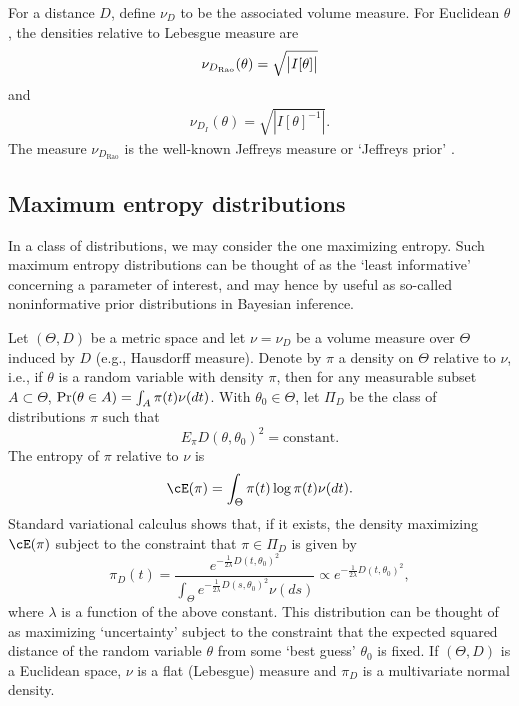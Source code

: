 \documentclass[preprint,12pt,authoryear]{elsarticle}
\def\lambdaexp{\frac{1}{2\lambda}} %
\DeclarePairedDelimiter{\abs}{\lvert}{\rvert}
\def\Pr{\mathop{\rm Pr}\nolimits}
\begin{document}


For a distance $D$, define $\nu_D$ to be the associated volume measure. For Euclidean $\theta$, the densities relative to Lebesgue measure are
\begin{align}\label{jef}
\nu_{D_\text{Rao}}(\theta)=\sqrt{\abs[\big]{I[\theta]}}
\end{align}
and
\begin{align}\label{invjef}
   \nu_{D_I}(\theta)=\sqrt{|I[\theta]^{-1}|}.
\end{align}
The measure $\nu_{D_\text{Rao}}$ is the well-known Jeffreys measure or `Jeffreys prior' \citep{jeffreys46}.




\subsection{Maximum entropy distributions}\label{app-maxent}

In a class of distributions, we may consider the one maximizing entropy. Such maximum entropy distributions can be thought of as the `least informative' concerning a parameter of interest, and may hence by useful as so-called noninformative prior distributions in Bayesian inference.

Let $(\Theta,D)$ be a metric space and let $\nu=\nu_D$ be a volume measure over $\Theta$ induced by $D$ (e.g., Hausdorff measure).
Denote by $\pi$ a density on $\Theta$ relative to $\nu$, i.e., if $\theta$ is a random variable with density $\pi$, then for any measurable subset $A\subset\Theta$, $\Pr(\theta\in A)=\int_A\pi(t)\nu(dt)$.
With $\theta_0\in\Theta$, let $\Pi_D$ be the class of distributions $\pi$ such that
\[  E_\pi D(\theta,\theta_0)^2 = \text{constant}. \]
The entropy of $\pi$ relative to $\nu$ is
\[  \cE(\pi) = \int_\Theta \pi(t)\log\pi(t)\nu(dt). \]
Standard variational calculus shows that, if it exists, the density maximizing $\cE(\pi)$ subject to the constraint that $\pi\in\Pi_D$ is given by
\[  \pi_{D}(t) = \frac{e^{-\lambdaexp D(t,\theta_0)^2}}{\int_\Theta e^{-\lambdaexp D(s,\theta_0)^2}\nu(ds)} \propto e^{-\lambdaexp D(t,\theta_0)^2},  \]
where $\lambda$ is a function of the above constant.
This distribution can be thought of as maximizing `uncertainty' subject to the constraint that the expected squared distance of the random variable $\theta$ from some `best guess' $\theta_0$ is fixed.
If $(\Theta,D)$ is a Euclidean space, $\nu$ is a flat (Lebesgue) measure and $\pi_D$ is a multivariate normal density.
\end{document}
